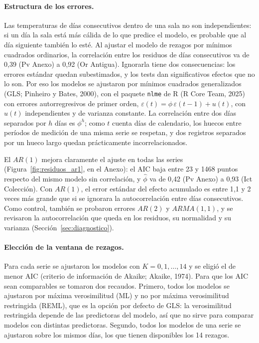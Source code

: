\documentclass[11pt,a4paper]{article}
\begin{document}
\paragraph{Estructura de los errores.} Las temperaturas de días consecutivos dentro de una sala no son independientes: si un día la sala está más cálida de lo que predice el modelo, es probable que al día siguiente también lo esté. Al ajustar el modelo de rezagos por mínimos cuadrados ordinarios, la correlación entre los residuos de días consecutivos va de 0{,}39 (Pv Anexo) a 0{,}92 (Or Antigua). Ignorarla tiene dos consecuencias: los errores estándar quedan subestimados, y los tests dan significativos efectos que no lo son. Por eso los modelos se ajustaron por mínimos cuadrados generalizados (GLS; Pinheiro y Bates, 2000), con el paquete \texttt{nlme} de R (R Core Team, 2025) con errores autorregresivos de primer orden, $\varepsilon(t) = \phi\,\varepsilon(t-1) + u(t)$, con $u(t)$ independientes y de varianza constante. La correlación entre dos días separados por $h$ días es $\phi^h$; como $t$ cuenta días de calendario, los huecos entre períodos de medición de una misma serie se respetan, y dos registros separados por un hueco largo quedan prácticamente incorrelacionados.

El $AR(1)$ mejora claramente el ajuste en todas las series (Figura~\ref{fig:residuos_ar1}, en el Anexo): el AIC baja entre 23 y 1468 puntos respecto del mismo modelo sin correlación, y $\hat\phi$ va de 0{,}42 (Pv Anexo) a 0{,}93 (Ict Colección). Con $AR(1)$, el error estándar del efecto acumulado es entre 1{,}1 y 2 veces más grande que si se ignorara la autocorrelación entre días consecutivos. Como control, también se probaron errores $AR(2)$ y $ARMA(1,1)$, y se revisaron la autocorrelación que queda en los residuos, su normalidad y su varianza (Sección~\ref{sec:diagnostico}).

\paragraph{Elección de la ventana de rezagos.} Para cada serie se ajustaron los modelos con $K = 0, 1, \dots, 14$ y se eligió el de menor AIC (criterio de información de Akaike; Akaike, 1974). Para que los AIC sean comparables se tomaron dos recaudos. Primero, todos los modelos se ajustaron por máxima verosimilitud (ML) y no por máxima verosimilitud restringida (REML), que es la opción por defecto de GLS: la verosimilitud restringida depende de las predictoras del modelo, así que no sirve para comparar modelos con distintas predictoras. Segundo, todos los modelos de una serie se ajustaron sobre los mismos días, los que tienen disponibles los 14 rezagos.
\end{document}
